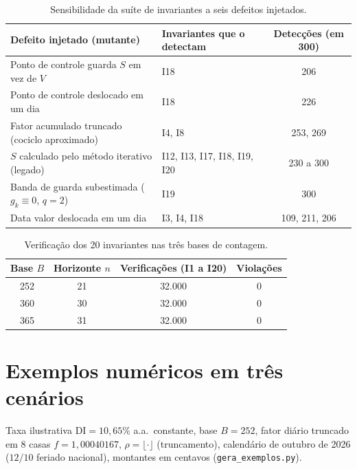 \documentclass[11pt, a4paper]{article}
\theoremstyle{definition}
\theoremstyle{plain}
\theoremstyle{remark}
\begin{document}
\begin{table}[htbp]
\centering
\small
\begin{tabular}{@{}llc@{}}
\toprule
\textbf{Defeito injetado (mutante)} & \textbf{Invariantes que o detectam} & \textbf{Detecções (em 300)} \\
\midrule
Ponto de controle guarda $S$ em vez de $V$          & I18                          & 206 \\
Ponto de controle deslocado em um dia               & I18                          & 226 \\
Fator acumulado truncado (cociclo aproximado)       & I4, I8                       & 253, 269 \\
$S$ calculado pelo método iterativo (legado)        & I12, I13, I17, I18, I19, I20 & 230 a 300 \\
Banda de guarda subestimada ($g_k \equiv 0$, $q=2$) & I19                          & 300 \\
Data valor deslocada em um dia                      & I3, I4, I18                  & 109, 211, 206 \\
\bottomrule
\end{tabular}
\caption{Sensibilidade da suíte de invariantes a seis defeitos injetados.}
\label{tab:4}
\end{table}

\begin{table}[htbp]
\centering
\small
\begin{tabular}{@{}cccc@{}}
\toprule
\textbf{Base $B$} & \textbf{Horizonte $n$} & \textbf{Verificações (I1 a I20)} & \textbf{Violações} \\
\midrule
252 & 21 & 32.000 & 0 \\
360 & 30 & 32.000 & 0 \\
365 & 31 & 32.000 & 0 \\
\bottomrule
\end{tabular}
\caption{Verificação dos 20 invariantes nas três bases de contagem.}
\label{tab:5}
\end{table}

\section{Exemplos numéricos em três cenários}\label{sec:7}

Taxa ilustrativa $\text{DI} = 10{,}65\%$ a.a.\ constante, base $B = 252$, fator diário truncado em 8 casas $f = 1{,}00040167$, $\rho = \lfloor \cdot \rfloor$ (truncamento), calendário de outubro de 2026 ($12/10$ feriado nacional), montantes em centavos (\texttt{gera\_exemplos.py}).
\end{document}
